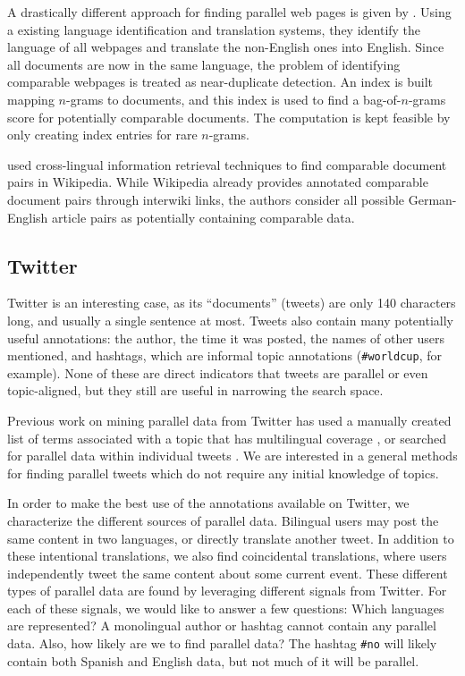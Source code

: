 A drastically different approach for finding parallel web pages is given by 
\citet{Uszkoreit10}. Using a existing language identification and translation
systems, they identify the language of all webpages and translate the
non-English ones into English. Since all documents are now in the same language,
the problem of identifying comparable webpages is treated as near-duplicate
detection. An index is built mapping $n$-grams to documents, and this index is
used to find a bag-of-$n$-grams score for potentially comparable documents. The
computation is kept feasible by only creating index entries for rare $n$-grams.

\citet{Ture12} used cross-lingual information retrieval techniques to find
comparable document pairs in Wikipedia. While Wikipedia already provides
annotated comparable document pairs through interwiki links, the authors
consider all possible German-English article pairs as potentially containing
comparable data.

\subsection{Twitter}
Twitter is an interesting case, as its ``documents'' (tweets) are only 140 characters
long, and usually a single sentence at most. Tweets also contain many
potentially useful annotations: the author, the time it was posted, the names of
other users mentioned, and hashtags, which are informal topic annotations
({\tt \#worldcup}, for example). None of these are direct indicators that tweets
are parallel or even topic-aligned, but they still are useful in narrowing
the search space. 

Previous work on mining parallel data from Twitter has used a
manually created list of terms associated with a topic that has multilingual
coverage \citep{Jehl12}, or searched for parallel
data within individual tweets \citep{Ling13}. We are interested in a general
methods for finding parallel tweets which do not require any initial knowledge
of topics.

In order to make the best use of the annotations available on Twitter, we
characterize the different sources of parallel data. Bilingual users may post
the same content in two languages, or directly translate another tweet. In
addition to these intentional translations, we also find coincidental
translations, where users independently tweet the same content about some
current event. These different types of parallel data are found by leveraging
different signals from Twitter. For each of these signals, we would like to
answer a few questions: Which languages are represented? A monolingual author or
hashtag cannot contain any parallel data. Also, how likely are we to
find parallel data? The hashtag {\tt \#no} will likely contain both Spanish and
English data, but not much of it will be parallel.

